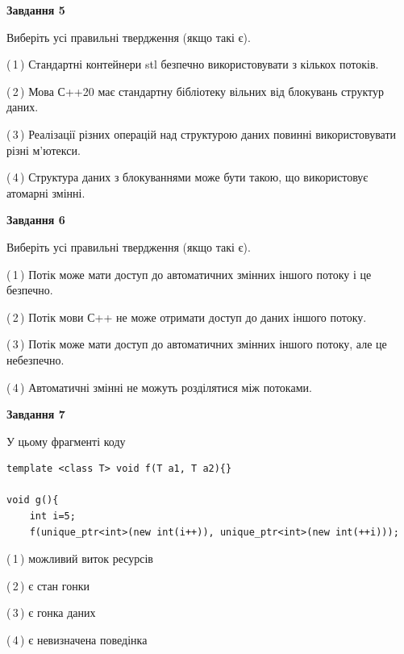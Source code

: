 \documentclass[12pt, ukrainian]{article}
\begin{document}
\begin {large}
{\begin{center}
\textbf{Завдання 5}
\end{center}

Виберіть усі правильні твердження (якщо такі є).\par
\vspace{2mm}

(\,1\,) Стандартні контейнери stl безпечно використовувати з кількох потоків.%

(\,2\,) Мова С++20 має стандартну бібліотеку вільних від блокувань структур даних.%

(\,3\,) Реалізації різних операцій над структурою даних повинні використовувати різні м’ютекси.%

(\,4\,) Структура даних з блокуваннями може бути такою, що використовує атомарні змінні.%
\newpage


\begin{center}
\textbf{Завдання 6}
\end{center}

Виберіть усі правильні твердження (якщо такі є).\par
\vspace{2mm}

(\,1\,) Потік може мати доступ до автоматичних змінних іншого потоку і це безпечно.%

(\,2\,) Потік мови С++ не може отримати доступ до даних іншого потоку.%

(\,3\,) Потік може мати доступ до автоматичних змінних іншого потоку, але це небезпечно.%

(\,4\,) Автоматичні змінні не можуть розділятися між потоками.%


\begin{center}
\textbf{Завдання 7}
\end{center}

У цьому фрагменті коду
\begin{verbatim}
template <class T> void f(T a1, T a2){}

void g(){
    int i=5;
    f(unique_ptr<int>(new int(i++)), unique_ptr<int>(new int(++i)));
\end{verbatim}

(\,1\,) можливий виток ресурсів%

(\,2\,) є стан гонки%

(\,3\,) є гонка даних%

(\,4\,) є невизначена поведінка%

}
\end {large}

\vspace{4mm}
\newpage
\end{document}
